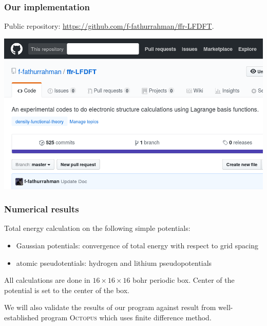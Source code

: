 \documentclass[10pt,t]{beamer}
\begin{document}
\begin{frame}[c]
\frametitle{Our implementation}
  
Public repository: \url{https://github.com/f-fathurrahman/ffr-LFDFT}.
  
{\centering
\includegraphics[scale=0.25]{images/ffr-LFDFT-github-cropped.png}
\par}
  
\end{frame}
  

\begin{frame}[c]
\frametitle{Numerical results}

Total energy calculation on the following simple potentials:
\begin{itemize}
\item Gaussian potentials: convergence of total energy with respect to
grid spacing
\item atomic pseudotentials: hydrogen and lithium pseudopotentials
\end{itemize}

All calculations are done in $16\times16\times16$ bohr periodic box.
Center of the potential is set to the center of the box.

We will also validate the results of our program against result from
well-established program \textsc{Octopus} which uses finite difference method.

\end{frame}
\end{document}
